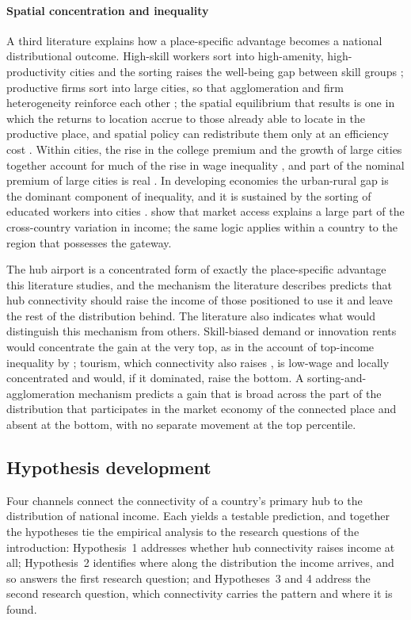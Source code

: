 \paragraph{Spatial concentration and inequality}
A third literature explains how a place-specific advantage becomes a national distributional outcome. High-skill workers sort into high-amenity, high-productivity cities and the sorting raises the well-being gap between skill groups \citep{Diamond_2016}; productive firms sort into large cities, so that agglomeration and firm heterogeneity reinforce each other \citep{Gaubert_2018}; the spatial equilibrium that results is one in which the returns to location accrue to those already able to locate in the productive place, and spatial policy can redistribute them only at an efficiency cost \citep{Fajgelbaum_2020}. Within cities, the rise in the college premium and the growth of large cities together account for much of the rise in wage inequality \citep{BaumSnow_2018}, and part of the nominal premium of large cities is real \citep{Moretti_2013}. In developing economies the urban-rural gap is the dominant component of inequality, and it is sustained by the sorting of educated workers into cities \citep{Young_2013}. \citet{Redding_2004} show that market access explains a large part of the cross-country variation in income; the same logic applies within a country to the region that possesses the gateway.

The hub airport is a concentrated form of exactly the place-specific advantage this literature studies, and the mechanism the literature describes predicts that hub connectivity should raise the income of those positioned to use it and leave the rest of the distribution behind. The literature also indicates what would distinguish this mechanism from others. Skill-biased demand or innovation rents would concentrate the gain at the very top, as in the account of top-income inequality by \citet{Aghion_2018}; tourism, which connectivity also raises \citep{Khadaroo_2008}, is low-wage and locally concentrated \citep{Faber_2019} and would, if it dominated, raise the bottom. A sorting-and-agglomeration mechanism predicts a gain that is broad across the part of the distribution that participates in the market economy of the connected place and absent at the bottom, with no separate movement at the top percentile.

\subsection{Hypothesis development}
\label{sec:framework}
Four channels connect the connectivity of a country's primary hub to the distribution of national income. Each yields a testable prediction, and together the hypotheses tie the empirical analysis to the research questions of the introduction: Hypothesis~1 addresses whether hub connectivity raises income at all; Hypothesis~2 identifies where along the distribution the income arrives, and so answers the first research question; and Hypotheses~3 and 4 address the second research question, which connectivity carries the pattern and where it is found.

